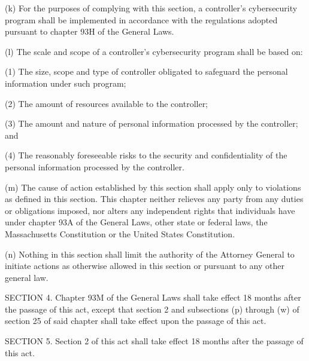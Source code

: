 (k) For the purposes of complying with this section, a controller’s cybersecurity program shall be implemented in accordance with the regulations adopted pursuant to chapter 93H of the General Laws.

(l) The scale and scope of a controller’s cybersecurity program shall be based on:

(1) The size, scope and type of controller obligated to safeguard the personal information under such program;

(2) The amount of resources available to the controller;

(3) The amount and nature of personal information processed by the controller; and

(4) The reasonably foreseeable risks to the security and confidentiality of the personal information processed by the controller.

(m) The cause of action established by this section shall apply only to violations as defined in this section. This chapter neither relieves any party from any duties or obligations imposed, nor alters any independent rights that individuals have under chapter 93A of the General Laws, other state or federal laws, the Massachusetts Constitution or the United States Constitution.

(n) Nothing in this section shall limit the authority of the Attorney General to initiate actions as otherwise allowed in this section or pursuant to any other general law.

SECTION 4. Chapter 93M of the General Laws shall take effect 18 months after the passage of this act, except that section 2 and subsections (p) through (w) of section 25 of said chapter shall take effect upon the passage of this act. 

SECTION 5. Section 2 of this act shall take effect 18 months after the passage of this act.